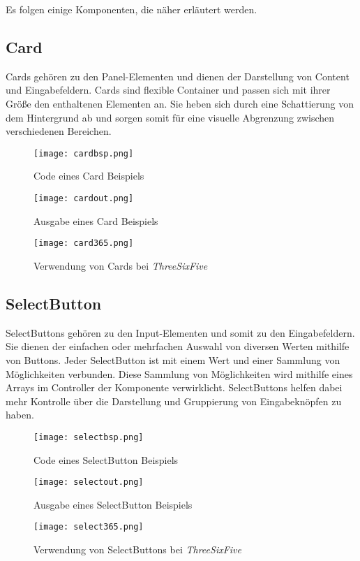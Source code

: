Es folgen einige Komponenten, die näher erläutert werden.

\subsection{Card}
Cards gehören zu den Panel-Elementen und dienen der Darstellung von Content und Eingabefeldern. Cards sind flexible Container und passen sich mit ihrer Größe den enthaltenen Elementen an. Sie heben sich durch eine Schattierung von dem Hintergrund ab und sorgen somit für eine visuelle Abgrenzung zwischen verschiedenen Bereichen.

\begin{figure}[H] \centering \texttt{[image: cardbsp.png]} \caption{Code eines Card Beispiels} \end{figure}
\begin{figure}[H] \centering \texttt{[image: cardout.png]} \caption{Ausgabe eines Card Beispiels} \end{figure}
\begin{figure}[H] \centering \texttt{[image: card365.png]} \caption{Verwendung von Cards bei \textit{ThreeSixFive}} \end{figure}

\subsection{SelectButton}
SelectButtons gehören zu den Input-Elementen und somit zu den Eingabefeldern. Sie dienen der einfachen oder mehrfachen Auswahl von diversen Werten mithilfe von Buttons. Jeder SelectButton ist mit einem Wert und einer Sammlung von Möglichkeiten verbunden. Diese Sammlung von Möglichkeiten wird mithilfe eines Arrays im Controller der Komponente verwirklicht. SelectButtons helfen dabei mehr Kontrolle über die Darstellung und Gruppierung von Eingabeknöpfen zu haben.

\begin{figure}[H] \centering \texttt{[image: selectbsp.png]} \caption{Code eines SelectButton Beispiels} \end{figure}
\begin{figure}[H] \centering \texttt{[image: selectout.png]} \caption{Ausgabe eines SelectButton Beispiels} \end{figure}
\begin{figure}[H] \centering \texttt{[image: select365.png]} \caption{Verwendung von SelectButtons bei \textit{ThreeSixFive}} \end{figure}

